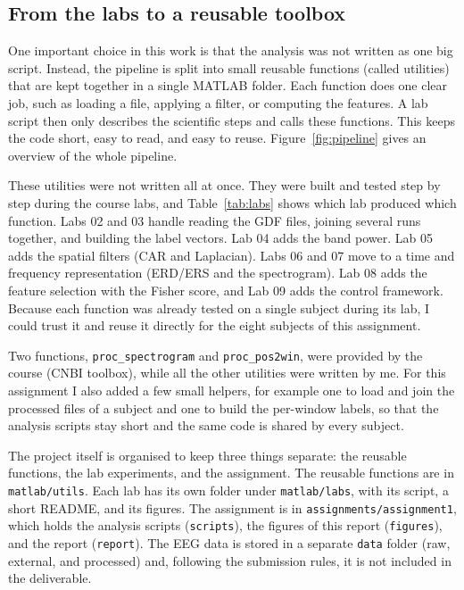 \documentclass[10pt,twocolumn,a4paper]{article}
\begin{document}
\subsection{From the labs to a reusable toolbox}
\label{sec:pipeline}

One important choice in this work is that the analysis was not written as one big
script. Instead, the pipeline is split into small reusable functions (called
utilities) that are kept together in a single MATLAB folder. Each function does
one clear job, such as loading a file, applying a filter, or computing the
features. A lab script then only describes the scientific steps and calls these
functions. This keeps the code short, easy to read, and easy to reuse.
Figure~\ref{fig:pipeline} gives an overview of the whole pipeline.

These utilities were not written all at once. They were built and tested step by
step during the course labs, and Table~\ref{tab:labs} shows which lab produced
which function. Labs 02 and 03 handle reading the GDF files, joining several runs
together, and building the label vectors. Lab 04 adds the band power. Lab 05 adds
the spatial filters (CAR and Laplacian). Labs 06 and 07 move to a time and
frequency representation (ERD/ERS and the spectrogram). Lab 08 adds the feature
selection with the Fisher score, and Lab 09 adds the control framework. Because
each function was already tested on a single subject during its lab, I could
trust it and reuse it directly for the eight subjects of this assignment.

Two functions, \texttt{proc\_spectrogram} and \texttt{proc\_pos2win}, were
provided by the course (CNBI toolbox), while all the other utilities were written
by me. For this assignment I also added a few small helpers, for example one to
load and join the processed files of a subject and one to build the per-window
labels, so that the analysis scripts stay short and the same code is shared by
every subject.

The project itself is organised to keep three things separate: the reusable
functions, the lab experiments, and the assignment. The reusable functions are
in \texttt{matlab/utils}. Each lab has its own folder under
\texttt{matlab/labs}, with its script, a short README, and its figures. The
assignment is in \texttt{assignments/assignment1}, which holds the analysis
scripts (\texttt{scripts}), the figures of this report (\texttt{figures}), and
the report (\texttt{report}). The EEG data is stored in a separate \texttt{data}
folder (raw, external, and processed) and, following the submission rules, it is
not included in the deliverable.
\end{document}
